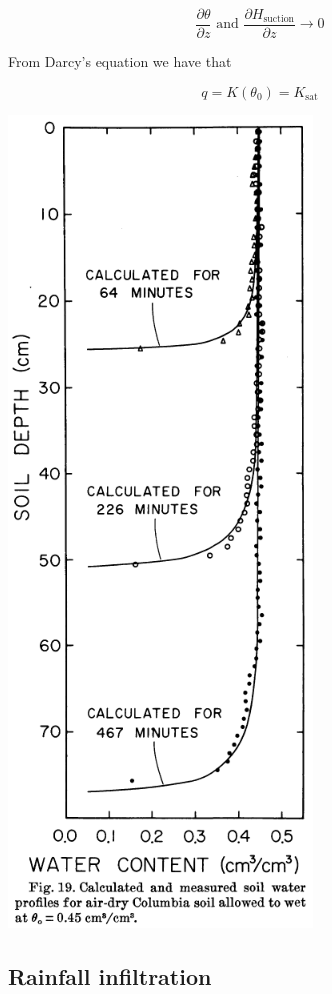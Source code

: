 \documentclass[
  letterpaper,
  DIV=11,
  numbers=noendperiod]{scrreprt}
\begin{document}
\[
\frac{\partial\theta}{\partial z} \text{ and } \frac{\partial H_\text{suction}}{\partial z} \longrightarrow 0
\]

From Darcy's equation we have that

\[
q = K(\theta_0) = K_\text{sat}
\]

\includegraphics{archive/figures/davidson-1963-figure19.png}

\hypertarget{rainfall-infiltration}{%
\subsection{Rainfall infiltration}\label{rainfall-infiltration}}
\end{document}
